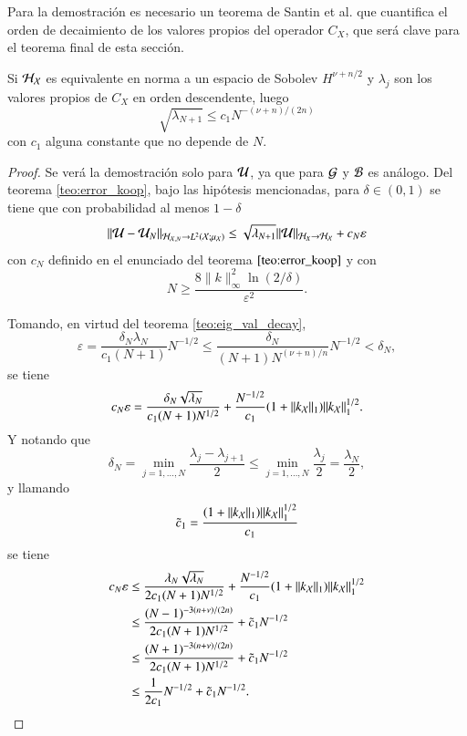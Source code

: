 Para la demostración es necesario un teorema de Santin et al. que cuantifica el orden de decaimiento de los valores propios del operador $C_X$, que será clave para el teorema final de esta sección.

\begin{teo}
    Si $\mathcal{H}_{\mathcal{X}}$ es equivalente en norma a un espacio de Sobolev $H^{\nu + n/2}$ y $\lambda_j$ son los valores propios de $C_X$ en orden descendente, luego
    \begin{equation*}
        \sqrt{\lambda_{N+1}} \leq c_1 N^{-(\nu + n)/(2n)}
    \end{equation*}
    con $c_1$ alguna constante que no depende de $N$.
    \label{teo:eig_val_decay}
\end{teo}

\begin{proof}
    Se verá la demostración solo para $\mathcal{U}$, ya que para $\mathcal{G}$ y $\mathcal{B}$ es análogo. Del teorema \ref{teo:error_koop}, bajo las hipótesis mencionadas, para $\delta \in (0, 1)$ se tiene que con probabilidad al menos $1-\delta$
    \[
    \|\mathcal{U} - \mathcal{U}_N \|_{\mathcal{H}_{\mathcal{X}, N} \to L^2(\mathcal{X}; \mu_{\mathcal{X}})} \leq \sqrt{\lambda_{N+1}} \|\mathcal{U} \|_{\mathcal{H}_{X} \to \mathcal{H_{\mathcal{X}}}} + c_N \varepsilon
    \]
    con $c_N$ definido en el enunciado del teorema $\ref{teo:error_koop}$ y con 
    \begin{equation}
        N \geq \frac{8\|k\|^2_\infty \ln(2/\delta)}{\varepsilon^2}.
        \label{eq:N_bound}
    \end{equation}

    Tomando, en virtud del teorema \ref{teo:eig_val_decay}, 
    \[
    \varepsilon = \frac{\delta_N \lambda_N}{c_1(N+1)} N^{-1/2} \leq \frac{\delta_N}{(N+1)N^{(\nu+n)/n}} N^{-1/2} <\delta_N,
    \]
    se tiene
    \[
    c_N \varepsilon = \frac{\delta_N \sqrt{\lambda_N}}{c_1 (N+1) N^{1/2}} + \frac{N^{-1/2}}{c_1} (1 + \|k_{\mathcal{X}}\|_{1}) \|k_{\mathcal{X}} \|^{1/2}_{1}.
    \]
    Y notando que 
    \[
    \delta_N = \min_{j=1, \dots, N} \frac{\lambda_j - \lambda_{j+1}}{2} \leq \min_{j=1, \dots, N} \frac{\lambda_j}{2} = \frac{\lambda_N}{2},
    \]
    y llamando
    \[
    \Tilde{c}_1 = \frac{(1 + \|k_{\mathcal{X}}\|_{1}) \|k_{\mathcal{X}} \|^{1/2}_{1}}{c_1}
    \]
    se tiene
    \[
    \begin{aligned}
        c_N \varepsilon & \leq  \frac{\lambda_N \sqrt{\lambda_N}}{2 c_1 (N+1) N^{1/2}} + \frac{N^{-1/2}}{c_1} (1 + \|k_{\mathcal{X}}\|_{1}) \|k_{\mathcal{X}} \|^{1/2}_{1} \\ 
        & \leq \frac{(N-1)^{-3(n+\nu)/(2n)}}{2 c_1 (N+1) N^{1/2}} + \Tilde{c}_1 N^{-1/2} \\
        & \leq \frac{(N+1)^{-3(n+\nu)/(2n)}}{2 c_1 (N+1) N^{1/2}} + \Tilde{c}_1 N^{-1/2} \\
        & \leq \frac{1}{2c_1} N^{-1/2} + \Tilde{c}_1 N^{-1/2}.
    \end{aligned}
    \]
    

\end{proof}
